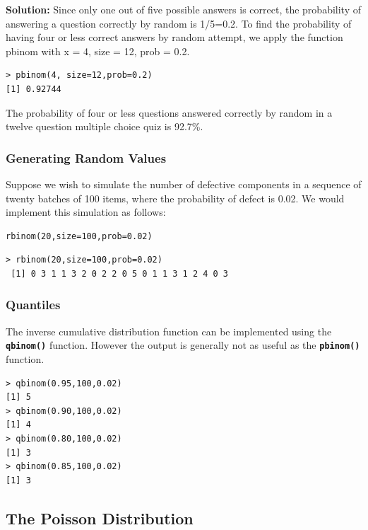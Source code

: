 \documentclass[a4paper,12pt]{article}
\begin{document}
\textbf{Solution:} Since only one out of five possible answers is correct, the probability of answering a question correctly by random is 1/5=0.2. To find the probability of having four or less correct answers by random attempt, we apply the function pbinom with x = 4, size = 12, prob = 0.2. 

\begin{verbatim}
> pbinom(4, size=12,prob=0.2) 
[1] 0.92744 
\end{verbatim}

The probability of four or less questions answered correctly by random in a twelve question multiple choice quiz is 92.7\%. 
 
\subsubsection{Generating Random Values}

Suppose we wish to simulate the number of defective components in a sequence of twenty batches of 100 items, where the probability of defect is 0.02. We would implement this simulation as follows:

\begin{framed}
\begin{verbatim}
rbinom(20,size=100,prob=0.02)
\end{verbatim}
\end{framed}

\begin{verbatim}
> rbinom(20,size=100,prob=0.02)
 [1] 0 3 1 1 3 2 0 2 2 0 5 0 1 1 3 1 2 4 0 3
\end{verbatim}
\subsubsection{Quantiles}
The inverse cumulative distribution function can be implemented using the \texttt{\textbf{qbinom()}} function.
However the output is generally not as useful as the \texttt{\textbf{pbinom()}} function.
\begin{verbatim}
> qbinom(0.95,100,0.02)
[1] 5
> qbinom(0.90,100,0.02)
[1] 4
> qbinom(0.80,100,0.02)
[1] 3
> qbinom(0.85,100,0.02)
[1] 3
\end{verbatim}

\newpage
\subsection{The Poisson Distribution}
\end{document}
